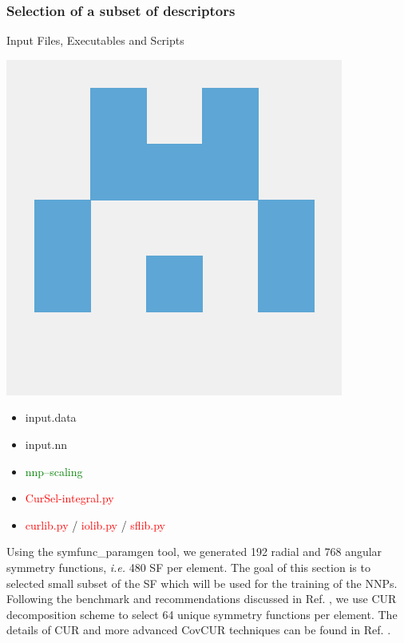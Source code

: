 \documentclass[12pt]{article}
\begin{document}
\subsubsection{Selection of a subset of descriptors}
\begin{mybox2}{{Input Files, Executables and Scripts}}
\begin{minipage}[c]{0.5\linewidth}
\includegraphics[scale=0.1]{n2p2.png}
\end{minipage}
\begin{minipage}[c]{0.5\linewidth}
\begin{itemize}
    \item input.data
    \item input.nn
    \item \textcolor{green}{nnp--scaling}
    \item \textcolor{red}{CurSel-integral.py}
    \item \textcolor{red}{curlib.py} / \textcolor{red}{iolib.py} / \textcolor{red}{sflib.py}
\end{itemize}
\end{minipage}
\end{mybox2}

Using the symfunc\_paramgen tool, we generated 192 radial and 768 angular symmetry functions, \textit{i.e.} 480 SF per element. The goal of this section is to selected small subset of the SF which will be used for the training of the NNPs. Following the benchmark and recommendations discussed in Ref. , we use CUR decomposition scheme to select 64 unique symmetry functions per element. The details of CUR and more advanced CovCUR techniques can be found in Ref. . 
\end{document}
